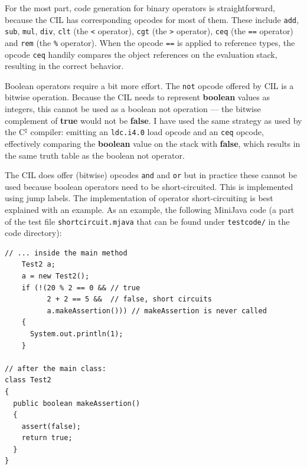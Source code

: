 \documentclass[a4paper,11pt]{article}
\begin{document}
For the most part, code generation for binary operators is straightforward, because the CIL has corresponding opcodes for most of them. These include \verb,add,, \verb,sub,, \verb,mul,, \verb,div,, \verb,clt, (the \verb,<, operator), \verb,cgt, (the \verb,>, operator), \verb,ceq, (the \verb,==, operator) and \verb,rem, (the \verb,%, operator). When the opcode \verb,==, is applied to reference types, the opcode \verb,ceq, handily compares the object references on the evaluation stack, resulting in the correct behavior.

Boolean operators require a bit more effort. The \verb,not, opcode offered by CIL is a bitwise operation. Because the CIL needs to represent \textbf{boolean} values as integers, this cannot be used as a boolean not operation --- the bitwise complement of \textbf{true} would not be \textbf{false}. I have used the same strategy as used by the C$^\sharp$ compiler: emitting an \verb,ldc.i4.0, load opcode and an \verb,ceq, opcode, effectively comparing the \textbf{boolean} value on the stack with \textbf{false}, which results in the same truth table as the boolean not operator.

The CIL does offer (bitwise) opcodes \verb,and, and \verb,or, but in practice these cannot be used because boolean operators need to be short-circuited. This is implemented using jump labels. The implementation of operator short-circuiting is best explained with an example. As an example, the following MiniJava code (a part of the test file \verb,shortcircuit.mjava, that can be found under \verb,testcode/, in the code directory):
\begin{verbatim}
// ... inside the main method
    Test2 a;
    a = new Test2();
    if (!(20 % 2 == 0 && // true
          2 + 2 == 5 &&  // false, short circuits
          a.makeAssertion())) // makeAssertion is never called
    {
      System.out.println(1);
    }

// after the main class:
class Test2
{
  public boolean makeAssertion()
  {
    assert(false);
    return true;
  }
}
\end{verbatim}
\end{document}
